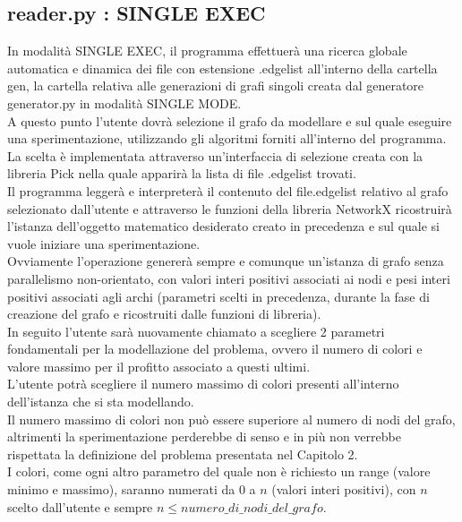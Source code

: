 \subsection{reader.py : SINGLE EXEC}
\justify
In modalità SINGLE EXEC, il programma effettuerà una ricerca globale automatica e dinamica dei file con estensione .edgelist all'interno della cartella gen, la cartella relativa alle generazioni di grafi singoli creata dal generatore generator.py in modalità SINGLE MODE.\\

A questo punto l'utente dovrà selezione il grafo da modellare e sul quale eseguire una sperimentazione, utilizzando gli algoritmi forniti all'interno del programma.\\
La scelta è implementata attraverso un'interfaccia di selezione creata con la libreria Pick nella quale apparirà la lista di file .edgelist trovati.\\

Il programma leggerà e interpreterà il contenuto del file.edgelist relativo al grafo selezionato dall'utente e attraverso le funzioni della libreria NetworkX ricostruirà l'istanza dell'oggetto matematico desiderato creato in precedenza e sul quale si vuole iniziare una sperimentazione.\\

Ovviamente l'operazione genererà sempre e comunque un'istanza di grafo senza parallelismo non-orientato, con valori interi positivi associati ai nodi e pesi interi positivi associati agli archi (parametri scelti in precedenza, durante la fase di creazione del grafo e ricostruiti dalle funzioni di libreria).\\

In seguito l'utente sarà nuovamente chiamato a scegliere 2 parametri fondamentali per la modellazione del problema, ovvero il numero di colori e valore massimo per il profitto associato a questi ultimi.\\

L'utente potrà scegliere il numero massimo di colori presenti all'interno dell'istanza che si sta modellando.\\
Il numero massimo di colori non può essere superiore al numero di nodi del grafo, altrimenti la sperimentazione perderebbe di senso e in più non verrebbe rispettata la definizione del problema presentata nel Capitolo 2.\\
I colori, come ogni altro parametro del quale non è richiesto un range (valore minimo e massimo), saranno numerati da 0 a \(n\) (valori interi positivi), con \(n\) scelto dall'utente e sempre \(n \leq numero\_di\_nodi\_del\_grafo\).\\


